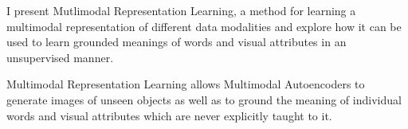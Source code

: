 I present Mutlimodal Representation Learning, a method for learning a multimodal representation of different data modalities and explore how it can be used to learn grounded meanings of words and visual attributes in an unsupervised manner.

Multimodal Representation Learning allows Multimodal Autoencoders to generate images of unseen objects as well as to ground the meaning of individual words and visual attributes which are never explicitly taught to it.